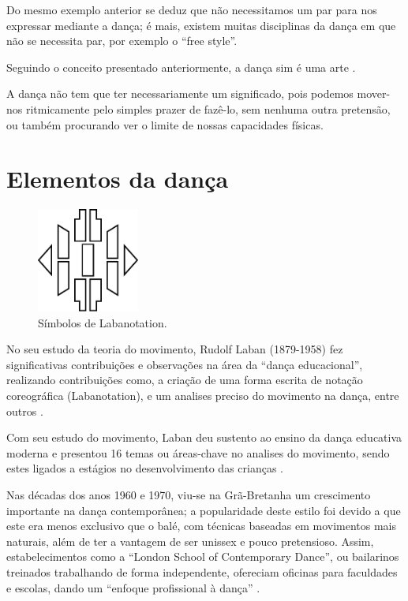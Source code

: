 Do mesmo exemplo anterior se deduz que não necessitamos um par para nos expressar mediante a dança;
é mais, existem muitas disciplinas da dança em que não se necessita par,
por exemplo o ``free style''.

Seguindo o conceito presentado anteriormente, a dança sim é uma arte \cite[pp. 17]{bencardinidanca}.

A dança não tem que ter necessariamente um significado, 
pois podemos mover-nos ritmicamente pelo simples prazer de fazê-lo, 
sem nenhuma outra pretensão, 
ou também procurando ver o limite de nossas capacidades físicas.

\section{Elementos da dança}
\begin{figure}
\centering
\includegraphics[width=0.30\textwidth]{chapters/cap-dance-elements/Labanotation2.eps}
\caption{Símbolos de Labanotation.}
\label{fig:elementosdanca1old}
\end{figure}
 No seu estudo da teoria do movimento, Rudolf Laban (1879-1958) fez significativas contribuições e
observações na área da ``dança  educacional'',  
realizando contribuições como, a criação de uma forma escrita de notação coreográfica (Labanotation), 
e um  analises preciso do movimento na dança, entre outros \cite[pp. 18]{elementosdanca2017} \cite[pp. 11]{paine2014complete}.

Com seu estudo do movimento, 
Laban  deu sustento ao ensino da dança educativa moderna e 
presentou 16 temas ou áreas-chave no analises do movimento, 
sendo estes ligados a estágios no desenvolvimento das crianças  \cite[pp. 12]{paine2014complete}.

Nas décadas dos anos 1960 e 1970, 
viu-se  na Grã-Bretanha um crescimento importante na dança contemporânea;
a popularidade deste estilo foi devido a que este era menos exclusivo que o balé, 
com técnicas baseadas em movimentos mais naturais, 
além de ter a vantagem de ser unissex e pouco pretensioso.
Assim, estabelecimentos como a ``London School of Contemporary Dance'',
ou bailarinos treinados trabalhando de forma independente,
ofereciam oficinas para faculdades e escolas,
dando um ``enfoque profissional à dança'' \cite[pp. 12]{paine2014complete}.

